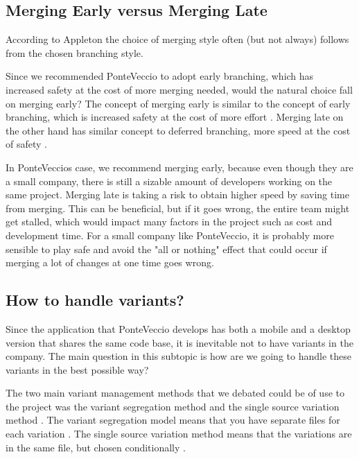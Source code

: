 \documentclass[10pt]{article}
\begin{document}
\subsection{Merging Early versus Merging Late}
\noindent According to Appleton \cite{Appleton} the choice of merging style often (but not always) follows from the chosen branching style.

\noindent Since we recommended PonteVeccio to adopt early branching, which has increased safety at the cost of more merging needed, would the natural choice fall on merging early? The concept of merging early is similar to the concept of early branching, which is increased safety at the cost of more effort \cite{l4b}. Merging late on the other hand has similar concept to deferred branching, more speed at the cost of safety \cite{l4b}.

\noindent In PonteVeccios case, we recommend merging early, because even though they are a small company, there is still a sizable amount of developers working on the same project. Merging late is taking a risk to obtain higher speed by saving time from merging. This can be beneficial, but if it goes wrong, the entire team might get stalled, which would impact many factors in the project such as cost and development time. For a small company like PonteVeccio, it is probably more sensible to play safe and avoid the "all or nothing" effect that could occur if merging a lot of changes at one time goes wrong.

\subsection{How to handle variants?}
Since the application that PonteVeccio develops has both a mobile and a desktop version that shares the same code base, it is inevitable not to have variants in the company. The main question in this subtopic is how are we going to handle these variants in the best possible way?

\noindent The two main variant management methods that we debated could be of use to the project was the variant segregation method and the single source variation method \cite{Mahler}. The variant segregation model means that you have separate files for each variation \cite{Mahler}. The single source variation method means that the variations are in the same file, but chosen conditionally \cite{Mahler}.
\end{document}
